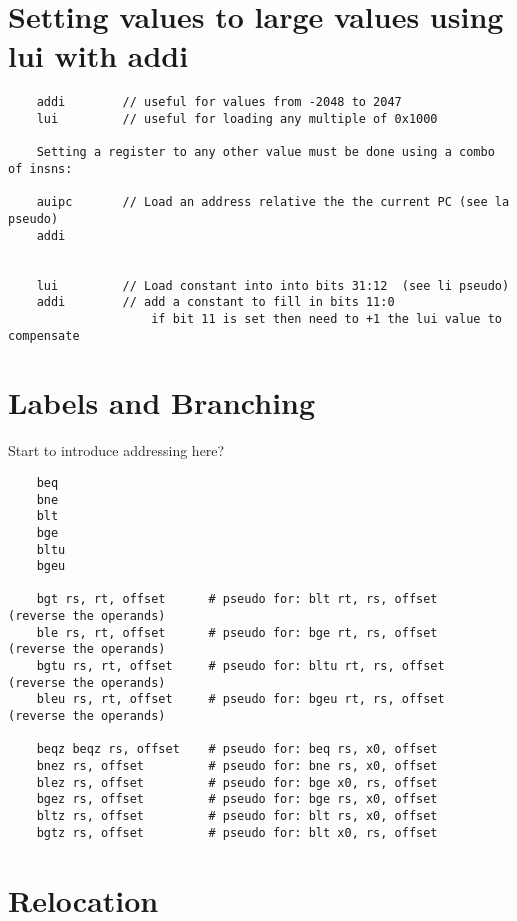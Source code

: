 \section{Setting values to large values using lui with addi}

\begin{verbatim}
    addi        // useful for values from -2048 to 2047
    lui         // useful for loading any multiple of 0x1000

    Setting a register to any other value must be done using a combo of insns:

    auipc       // Load an address relative the the current PC (see la pseudo)
    addi


    lui         // Load constant into into bits 31:12  (see li pseudo)
    addi        // add a constant to fill in bits 11:0
                    if bit 11 is set then need to +1 the lui value to compensate
\end{verbatim}


\section{Labels and Branching}

Start to introduce addressing here?

\begin{verbatim}
    beq
    bne
    blt
    bge
    bltu
    bgeu

    bgt rs, rt, offset      # pseudo for: blt rt, rs, offset    (reverse the operands)
    ble rs, rt, offset      # pseudo for: bge rt, rs, offset    (reverse the operands)
    bgtu rs, rt, offset     # pseudo for: bltu rt, rs, offset   (reverse the operands)
    bleu rs, rt, offset     # pseudo for: bgeu rt, rs, offset   (reverse the operands)

    beqz beqz rs, offset    # pseudo for: beq rs, x0, offset
    bnez rs, offset         # pseudo for: bne rs, x0, offset
    blez rs, offset         # pseudo for: bge x0, rs, offset
    bgez rs, offset         # pseudo for: bge rs, x0, offset
    bltz rs, offset         # pseudo for: blt rs, x0, offset
    bgtz rs, offset         # pseudo for: blt x0, rs, offset
\end{verbatim}


\section{Relocation}

